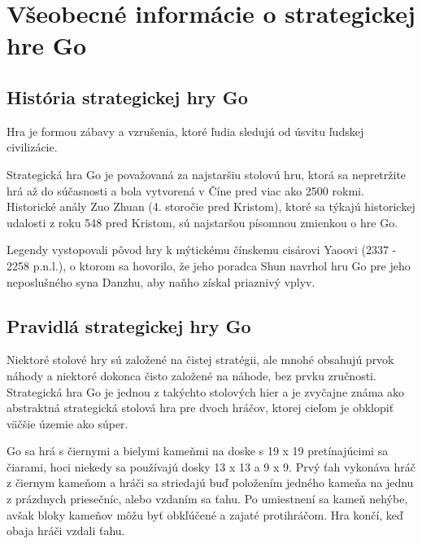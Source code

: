 \documentclass[10pt,twoside,slovak,a4paper]{article}
\begin{document}


\section{Všeobecné informácie o strategickej hre Go}
\subsection{História strategickej hry Go}
Hra je formou zábavy a vzrušenia, ktoré ľudia sledujú od úsvitu ľudskej civilizácie.\cite{9231758}

Strategická hra Go je považovaná za najstaršiu stolovú hru, ktorá sa nepretržite hrá až do súčasnosti a bola vytvorená v Číne pred viac ako 2500 rokmi. Historické anály Zuo Zhuan (4. storočie pred Kristom), ktoré sa týkajú historickej udalosti z roku 548 pred Kristom, sú najstaršou písomnou zmienkou o hre Go.\cite{9231758} 

Legendy vystopovali pôvod hry k mýtickému čínskemu cisárovi Yaoovi (2337 - 2258 p.n.l.), o ktorom sa hovorilo, že jeho poradca Shun navrhol hru Go pre jeho neposlušného syna Danzhu, aby naňho získal priaznivý vplyv.\cite{9231758}

\subsection{Pravidlá strategickej hry Go}\label{Pravidlá strategickej hry Go}
Niektoré stolové hry sú založené na čistej stratégii, ale mnohé obsahujú prvok náhody a niektoré dokonca čisto založené na náhode, bez prvku zručnosti. Strategická hra Go je jednou z takýchto stolových hier a je zvyčajne známa ako abstraktná strategická stolová hra pre dvoch hráčov, ktorej cieľom je obklopiť väčšie územie ako súper.\cite{9231758}

Go sa hrá s čiernymi a bielymi kameňmi na doske s 19 x 19 pretínajúcimi sa čiarami, hoci niekedy sa používajú dosky 13 x 13 a 9 x 9. Prvý ťah vykonáva hráč z čiernym kameňom a hráči sa striedajú buď položením jedného kameňa na jednu z prázdnych priesečníc, alebo vzdaním sa ťahu. Po umiestnení sa kameň nehýbe, avšak bloky kameňov môžu byť obkľúčené a zajaté protihráčom. Hra končí, keď obaja hráči vzdali ťahu.\cite{10.1145/792548.611939}
\end{document}
